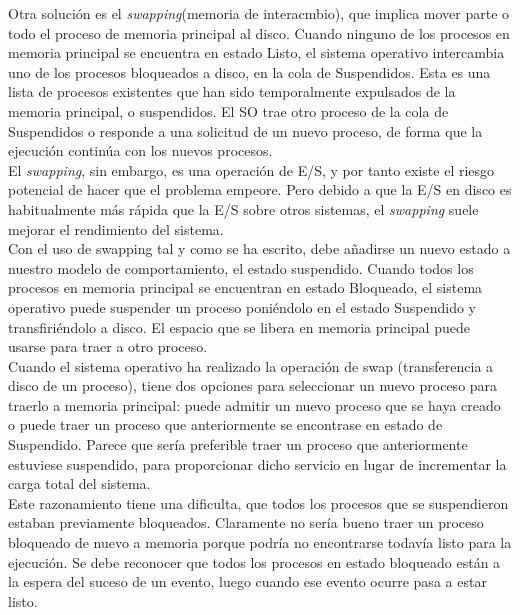 \documentclass{article}
\begin{document}
				Otra solución es el \textit{swapping}(memoria de interacmbio), que implica mover parte o todo el proceso de memoria principal al disco. Cuando ninguno de los procesos en memoria principal se encuentra en estado Listo, el sistema operativo intercambia uno de los procesos bloqueados a disco, en la cola de Suspendidos. Esta es una lista de procesos existentes que han sido temporalmente expulsados de la memoria principal, o suspendidos. El SO trae otro proceso de la cola de Suspendidos o responde a una solicitud de un nuevo proceso, de forma que la ejecución continúa con los nuevos procesos. \\
				
				El \textit{swapping}, sin embargo, es una operación de E/S, y por tanto existe el riesgo potencial de hacer que el problema empeore. Pero debido a que la E/S en disco es habitualmente más rápida que la E/S sobre otros sistemas, el \textit{swapping} suele mejorar el rendimiento del sistema. \\
				
				Con el uso de swapping tal y como se ha escrito, debe añadirse un nuevo estado a nuestro modelo de comportamiento, el estado suspendido. Cuando todos los procesos en memoria principal se encuentran en estado Bloqueado, el sistema operativo puede suspender un proceso poniéndolo en el estado Suspendido y transfiriéndolo a disco. El espacio que se libera en memoria principal puede usarse para traer a otro proceso. \\
				
				Cuando el sistema operativo ha realizado la operación de swap (transferencia a disco de un proceso), tiene dos opciones para seleccionar un nuevo proceso para traerlo a memoria principal: puede admitir un nuevo proceso que se haya creado o puede traer un proceso que anteriormente se encontrase en estado de Suspendido. Parece que sería preferible traer un proceso que anteriormente estuviese suspendido, para proporcionar dicho servicio en lugar de incrementar la carga total del
sistema. \\
				
				Este razonamiento tiene una dificulta, que todos los procesos que se suspendieron estaban previamente bloqueados. Claramente no sería bueno traer un proceso bloqueado de nuevo a memoria porque podría no encontrarse todavía listo para la ejecución. Se debe reconocer que todos los procesos en estado bloqueado están a la espera del suceso de un evento, luego cuando ese evento ocurre pasa a estar listo. \\
				
\end{document}
